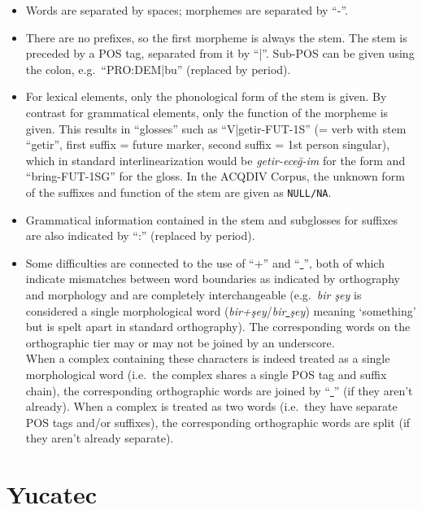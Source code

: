 \documentclass[a4paper, 11pt]{book}
\newcommand{\und}{\underline{{ }}\hspace{0.2mm}}	%
\begin{document}
\begin{itemize}
	\item Words are separated by spaces; morphemes are separated by “-”. 
	\item There are no prefixes, so the first morpheme is always the stem. The stem is preceded by a POS tag, separated from it by “|”. 
		Sub-POS can be given using the colon, e.g.\ “PRO:DEM|bu” (replaced by period).
	\item For lexical elements, only the phonological form of the stem is given. By contrast for grammatical elements, only the function of the morpheme is given. 
		This results in “glosses” such as “V|getir-FUT-1S” (= verb with stem “getir”, first suffix = future marker, second suffix = 1st person singular), 
		which in standard interlinearization would be \emph{getir-eceğ-im} for the form and “bring-FUT-1SG” for the gloss. In the ACQDIV Corpus, the unknown
		form of the suffixes and function of the stem are given as \texttt{NULL/NA}.
	\item Grammatical information contained in the stem and subglosses for suffixes are also indicated by “:” (replaced by period). 
	\item Some difficulties are connected to the use of “+” and “\und”, both of which indicate mismatches between word boundaries as indicated by orthography
		and morphology and are completely interchangeable (e.g.\ \emph{bir şey} is considered a single morphological word (\emph{bir+şey}/\emph{bir\und şey})
		meaning ‘something’ but is spelt apart in standard orthography). The corresponding words on the orthographic tier may or may not be joined by
		an underscore. \\
		When a complex containing these characters is indeed treated as a single morphological word (i.e.\ the complex shares a single POS tag and suffix chain), 
		the corresponding orthographic words are joined by “\und” (if they aren’t already). When a complex is treated as two words (i.e.\ they have separate
		POS tags and/or suffixes), the corresponding orthographic words are split (if they aren’t already separate). 	
\end{itemize}


\section{Yucatec}
\label{sec:Yucatec}
\end{document}
